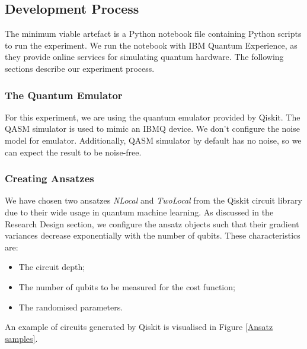 \subsection{Development Process}
The minimum viable artefact is a Python notebook file containing Python scripts to run the experiment.
We run the notebook with IBM Quantum Experience, as they provide online services for simulating quantum hardware.
The following sections describe our experiment process.

\subsubsection{The Quantum Emulator}
For this experiment, we are using the quantum emulator provided by Qiskit.
The QASM simulator is used to mimic an IBMQ device.
We don't configure the noise model for emulator. 
Additionally, QASM simulator by default has no noise, so we can expect the result to be noise-free.

\subsubsection{Creating Ansatzes}
We have chosen two ansatzes \textit{NLocal} and \textit{TwoLocal} from the Qiskit circuit library due to their wide usage in quantum machine learning.
As discussed in the Research Design section, we configure the ansatz objects such that their gradient variances decrease exponentially with the number of qubits.
These characteristics are:
\begin{itemize}
    \item The circuit depth;
    \item The number of qubits to be measured for the cost function;
    \item The randomised parameters.
\end{itemize}
An example of circuits generated by Qiskit is visualised in Figure \ref{Ansatz samples}.

